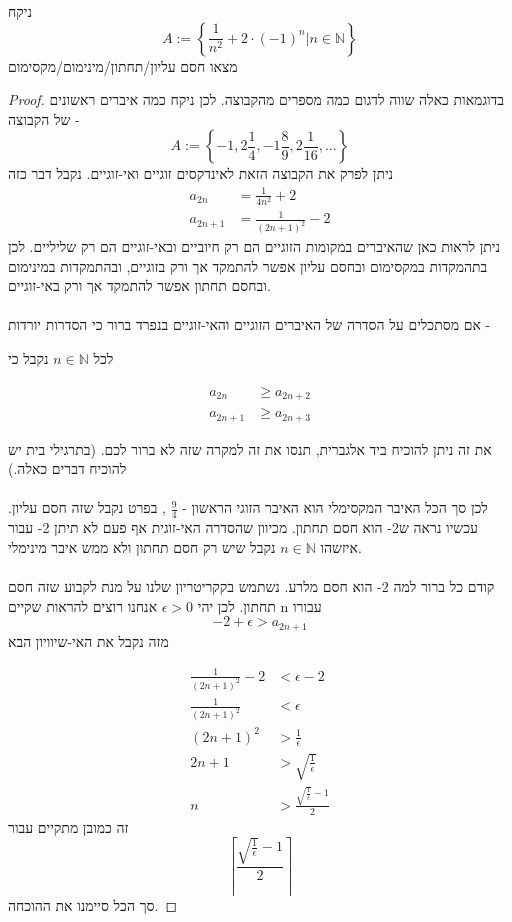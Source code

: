 \documentclass{article}
\begin{document}
\begin{exercise}
ניקח 
\[A:=\left\{\frac{1}{n^2} + 2\cdot(-1)^n\Big| n\in\mathbb{N}\right\}\]
מצאו חסם עליון/תחתון/מינימום/מקסימום

\end{exercise}
\begin{proof}
בדוגמאות כאלה שווה לדגום כמה מספרים מהקבוצה. לכן ניקח כמה איברים ראשונים של הקבוצה - 
\[A:= \left\{-1, 2\frac{1}{4}, -1\frac{8}{9}, 2\frac{1}{16}, \dots\right\}\]
ניתן לפרק את הקבוצה הזאת לאינדקסים זוגיים ואי-זוגיים. נקבל דבר כזה
\begin{align*}
a_{2n} &= \frac{1}{4n^2} + 2 \\
a_{2n+1}&= \frac{1}{(2n+1)^2} -2
\end{align*}
ניתן לראות כאן שהאיברים במקומות הזוגיים הם רק חיוביים ובאי-זוגיים הם רק שליליים. לכן בתהמקדות במקסימום ובחסם עליון אפשר להתמקד אך ורק בזוגיים, ובהתמקדות במינימום ובחסם תחתון אפשר להתמקד אך ורק באי-זוגיים.
\\\\
אם מסתכלים על הסדרה של האיברים הזוגיים והאי-זוגיים בנפרד ברור כי הסדרות יורדות - 
\begin{claim}
לכל 
$n\in\mathbb{N}$
נקבל כי 

\begin{align*}
a_{2n}&\geq a_{2n+2} \\
a_{2n+1}&\geq a_{2n+3}
\end{align*}

\end{claim}
את זה ניתן להוכיח ביד אלגברית, תנסו את זה למקרה שזה לא ברור לכם. (בתרגילי בית יש להוכיח דברים כאלה.)\\\\
לכן סך הכל האיבר המקסימלי הוא האיבר הזוגי הראשון - 
$\frac{9}{4}$
, בפרט נקבל שזה חסם עליון. עכשיו נראה ש2- הוא חסם תחתון. מכיוון שהסדרה האי-זוגית אף פעם לא תיתן 2- עבור איזשהו 
$n\in\mathbb{N}$
נקבל שיש רק חסם תחתון ולא ממש איבר מינימלי. \\\\
קודם כל ברור למה 2- הוא חסם מלרע. נשתמש בקקריטריון שלנו על מנת לקבוע שזה חסם תחתון. לכן יהי
$\epsilon>0$
אנחנו רוצים להראות שקיים n עבורו 
\[-2+\epsilon>a_{2n+1}\]
מזה נקבל את האי-שיוויון הבא

\begin{align*}
\frac{1}{(2n+1)^2} -2 &< \epsilon -2 \\
\frac{1}{(2n+1)^2} &< \epsilon \\
(2n+1)^2 &> \frac{1}{\epsilon} \\
2n+1 &> \sqrt{\frac{1}{\epsilon}} \\
n &> \frac{\sqrt{\frac{1}{\epsilon}} - 1}{2}
\end{align*}
זה כמובן מתקיים עבור
\[\left\lceil\frac{\sqrt{\frac{1}{\epsilon}} - 1}{2}\right\rceil\]
סך הכל סיימנו את ההוכחה.
\end{proof}
\end{document}
